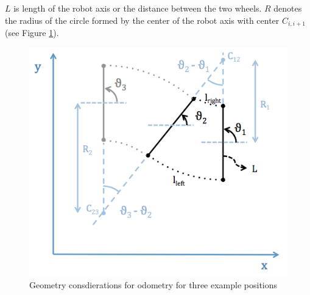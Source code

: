 $L$ is length of the robot axis or the distance between the two wheels. 
$R$ denotes the radius of the circle formed by the center of the robot axis with center $C_{i,i+1}$ (see Figure \ref{fig:odometry}).
\hspace{2em}

\begin{figure}[htb]
    \centering
    \includegraphics[width=0.7\linewidth]{files/Odometry.png}
    \caption{Geometry consdierations for odometry for three example positions}
    \label{fig:odometry}
\end{figure}
